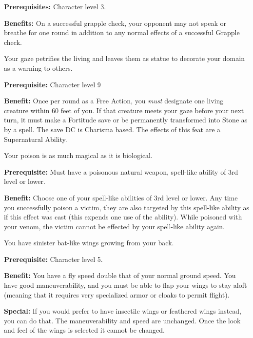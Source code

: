 \textbf{Prerequisites:} Character level 3.

\textbf{Benefits:} On a successful grapple check, your opponent may not speak or breathe for one round in addition to any normal effects of a successful Grapple check.


Your gaze petrifies the living and leaves them as statue to decorate your domain as a warning to others.

\textbf{Prerequisite:} Character level 9

\textbf{Benefit:} Once per round as a Free Action, you \textit{must} designate one living creature within 60 feet of you. If that creature meets your gaze before your next turn, it must make a Fortitude save or be permanently transformed into Stone as by a  spell. The save DC is Charisma based. The effects of this feat are a Supernatural Ability.


Your poison is as much magical as it is biological.

\textbf{Prerequisite:} Must have a poisonous natural weapon, spell-like ability of 3rd level or lower.

\textbf{Benefit:} Choose one of your spell-like abilities of 3rd level or lower. Any time you successfully poison a victim, they are also targeted by this spell-like ability as if this effect was cast (this expends one use of the ability). While poisoned with your venom, the victim cannot be effected by your spell-like ability again.


You have sinister bat-like wings growing from your back.

\textbf{Prerequisite:} Character level 5.

\textbf{Benefit:} You have a fly speed double that of your normal ground speed. You have good maneuverability, and you must be able to flap your wings to stay aloft (meaning that it requires very specialized armor or cloaks to permit flight).

\textbf{Special:} If you would prefer to have insectile wings or feathered wings instead, you can do that. The maneuverability and speed are unchanged. Once the look and feel of the wings is selected it cannot be changed.

